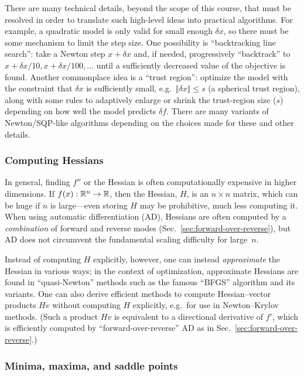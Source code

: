 There are many technical details, beyond the scope of this course, that must be resolved in order to translate such high-level ideas into practical algorithms.
For example, a quadratic model is only valid for small enough $\delta x$, so there must be some mechanism to limit the step size. One possibility is ``backtracking line search'': take a Newton step $x+\delta x$ and, if needed, progressively ``backtrack'' to $x+\delta x/10, x+\delta x/100, \ldots$ until a  sufficiently decreased value of the objective is found.  Another commonplace idea is a ``trust region'': optimize the model with the constraint that $\delta x$ is sufficiently small, e.g.~$\Vert \delta x \Vert \le s$ (a spherical trust region), along with some rules to adaptively enlarge or shrink the trust-region size ($s$) depending on how well the model predicts $\delta f$.  There are many variants of Newton/SQP-like algorithms depending on the choices made for these and other details.

\subsubsection{Computing Hessians}

In general, finding $f''$ or the Hessian is often computationally expensive in higher dimensions. If $f(x): \mathbb R^n\to\mathbb R$, then the Hessian, $H$, is an $n\times n$ matrix, which can be huge if $n$ is large---even storing $H$ may be prohibitive, much less computing it. When using automatic differentiation (AD), Hessians are often computed by a \emph{combination} of forward and reverse modes (Sec.~\ref{sec:forward-over-reverse}), but AD does not circumvent the fundamental scaling difficulty for large~$n$.

Instead of computing $H$ explicitly, however, one can instead \emph{approximate} the Hessian in various ways; in the context of optimization, approximate Hessians are found in ``quasi-Newton'' methods such as the famous ``BFGS'' algorithm and its variants. One can also derive efficient methods to compute Hessian--vector products $Hv$ without computing $H$ explicitly, e.g.~for use in Newton--Krylov methods.   (Such a product $Hv$ is equivalent to a directional derivative of $f'$, which is efficiently computed by ``forward-over-reverse'' AD as in Sec.~\ref{sec:forward-over-reverse}.)

\subsubsection{Minima, maxima, and saddle points}

